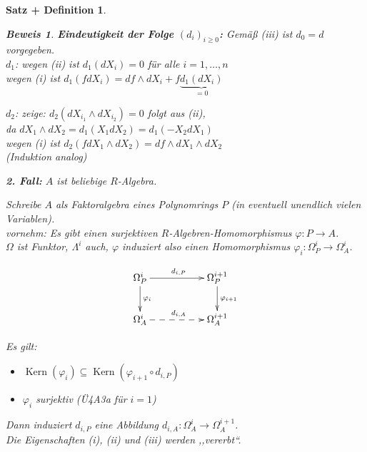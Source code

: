 \documentclass[a4paper,12pt]{scrbook}
\theoremstyle{break}
\newtheorem{SatzDef}[Satz]{Satz + Definition}
\theoremstyle{nonumberbreak}
\newtheorem{Bew}{Beweis}
\theoremstyle{nonumberplain}
\DeclareMathOperator{\Kern}{Kern}
\begin{document}
\begin{SatzDef}
\begin{Bew}
\textbf{Eindeutigkeit der Folge $\left(d_i\right)_{i\geq 0}$:} Gemäß (iii) ist $d_0=d$ vorgegeben.\\
$d_1$: wegen (ii) ist $d_1(dX_i)=0$ für alle $i=1, \ldots, n$\\
wegen (i) ist $d_1(fdX_i)=df\wedge dX_i+f\underbrace{d_1(dX_i)}_{=0}$

$d_2$: zeige: $d_2(dX_{i_1}\wedge dX_{i_2})=0$ folgt aus (ii),\\
da $dX_1\wedge dX_2=d_1(X_1 dX_2)=d_1(-X_2dX_1)$\\
wegen (i) ist $d_2(fdX_1\wedge dX_2)=df\wedge dX_1\wedge dX_2$\\
(Induktion analog)

\textbf{2. Fall:} $A$ ist beliebige $R$-Algebra.

Schreibe $A$ als Faktoralgebra eines Polynomrings $P$ (in eventuell unendlich vielen Variablen).\\
vornehm: Es gibt einen surjektiven $R$-Algebren-Homomorphismus $\varphi:P\to A$.\\
$\Omega$ ist Funktor, $\Lambda^i$ auch, $\varphi$ induziert also einen Homomorphismus 
$\varphi_i: \Omega_P^{i}\to \Omega_A^{i}$.

\[
\begin{xy}
\xymatrix{
\Omega_P^i\ar[rr]^{d_{i,P}}\ar[d]^{\varphi_i}&&\Omega_P^{i+1}\ar[d]^{\varphi_{i+1}}\\
\Omega_A^i\ar@{-->}[rr]^{d_{i,A}}&&\Omega_A^{i+1}\\
}
\end{xy}
\]

Es gilt: 
\begin{itemize}
\item $\Kern(\varphi_i)\subseteq \Kern(\varphi_{i+1}\circ d_{i,P})$
\item $\varphi_i$ surjektiv (Ü4A3a für $i=1$)
\end{itemize}

Dann induziert $d_{i,P}$ eine Abbildung $d_{i,A}: \Omega_A^{i}\to \Omega_A^{i+1}$.\\
Die Eigenschaften (i), (ii) und (iii) werden ,,vererbt``.

\end{Bew}
\end{SatzDef}
\end{document}
